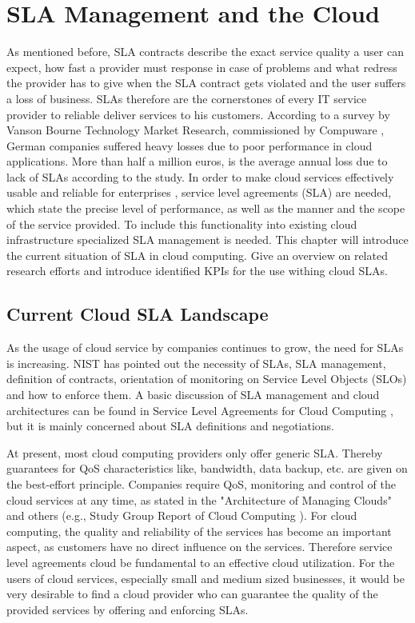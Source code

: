 
\chapter{SLA Management and the Cloud} %

As mentioned before, SLA contracts describe the exact service quality a user can expect, how fast a provider must response in case of problems and what redress the provider has to give when the SLA contract gets violated and the user suffers a loss of business. SLAs therefore are the cornerstones of every IT service provider to reliable deliver services to his customers. According to a survey by Vanson Bourne Technology Market Research, commissioned by Compuware \cite{Bourne}, German companies suffered heavy losses due to poor performance in cloud applications. More than half a million euros, is the average annual loss due to lack of SLAs according to the study. In order to make cloud services effectively usable \cite{IDC} and reliable for enterprises \cite{JTC}, service level agreements (SLA) are needed, which state the precise level of performance, as well as the manner and the scope of the service provided. To include this functionality into existing cloud infrastructure specialized SLA management is needed. This chapter will introduce the current situation of SLA in cloud computing. Give an overview on related research efforts and introduce identified KPIs for the use withing cloud SLAs.


\section{Current Cloud SLA Landscape}
As the usage of cloud service by companies continues to grow, the need for SLAs is increasing. NIST  has pointed out the necessity of SLAs, SLA management, definition of contracts, orientation of monitoring on Service Level Objects (SLOs) and how to enforce them. A basic discussion of SLA management and cloud architectures can be found in Service Level Agreements for Cloud Computing \cite{Wieder2011}, but it is mainly concerned about SLA definitions and negotiations.

At present, most cloud computing providers only offer generic SLA. Thereby guarantees for QoS characteristics like, bandwidth, data backup, etc. are given  on the best-effort principle. Companies require QoS, monitoring and control of the cloud services at any time, as stated in the "Architecture of Managing Clouds" \cite{DMTF2010} and others (e.g., Study Group Report of Cloud Computing \cite{SC38StudyGroup2011}). For cloud computing, the quality and reliability of the services has become an important aspect, as customers have no direct influence on the services. Therefore service level agreements cloud be fundamental to an effective cloud utilization. For the users of cloud services, especially small and medium sized businesses, it would be very desirable to find a cloud provider who can guarantee the quality of the provided services by offering and enforcing SLAs.

